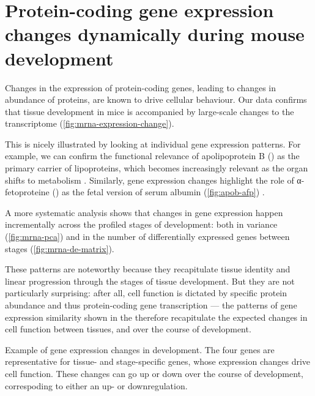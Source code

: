 
\section{Protein-coding gene expression changes dynamically during mouse
development}

Changes in the expression of protein-coding genes, leading to changes in
abundance of proteins, are known to drive cellular behaviour. Our data
confirms that tissue development in mice is accompanied by large-scale changes
to the \mrna transcriptome (\cref{fig:mrna-expression-change}).

This is nicely illustrated by looking at individual gene expression patterns.
For example, we can confirm the functional relevance of apolipoprotein B
() as the primary carrier of lipoproteins, which becomes
increasingly relevant as the organ shifts to metabolism \citep{Knott:1986}.
Similarly, \mrna gene expression changes highlight the role of α-fetoproteine
() as the fetal version of serum albumin (\cref{fig:apob-afp})
\citep{Chen:1997}.

A more systematic analysis shows that changes in gene expression happen
incrementally across the profiled stages of development: both in variance
(\cref{fig:mrna-pca}) and in the number of differentially expressed genes
between stages (\cref{fig:mrna-de-matrix}).

These patterns are noteworthy because they recapitulate tissue identity and
linear progression through the stages of tissue development. But they are not
particularly surprising: after all, cell function is dictated by specific
protein abundance and thus protein-coding gene transcription --- the patterns of
gene expression similarity shown in the \pca therefore recapitulate the expected
changes in cell function between tissues, and over the course of development.

    {Example of gene expression changes in development.}
    {The four genes are representative for tissue- and stage-specific genes,
    whose expression changes drive cell function. These changes can go up or
    down over the course of development, correspoding to either an up- or
    downregulation.}

